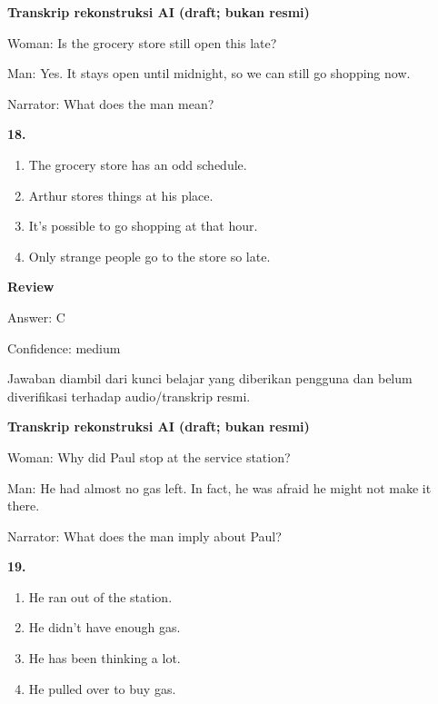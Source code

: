 \documentclass[12pt]{article}
\begin{document}
\endgroup
\par
\vspace{0.25\baselineskip}
\begin{exampleblock}
\textbf{Transkrip rekonstruksi AI (draft; bukan resmi)}\par
Woman: Is the grocery store still open this late?\par
Man: Yes. It stays open until midnight, so we can still go shopping now.\par
Narrator: What does the man mean?\par
\end{exampleblock}
\noindent\textbf{18.}
\begin{enumerate}[label=(\Alph*),leftmargin=*,itemsep=0.2em]
\item The grocery store has an odd schedule.
\item Arthur stores things at his place.
\item It's possible to go shopping at that hour.
\item Only strange people go to the store so late.
\end{enumerate}
\par
\begingroup
\setlength{\parskip}{0pt}
\setlength{\parindent}{0pt}
\textbf{Review}\par
Answer: C\par
Confidence: medium\par
Jawaban diambil dari kunci belajar yang diberikan pengguna dan belum diverifikasi terhadap audio/transkrip resmi.\par
\endgroup
\par
\vspace{0.25\baselineskip}
\begin{exampleblock}
\textbf{Transkrip rekonstruksi AI (draft; bukan resmi)}\par
Woman: Why did Paul stop at the service station?\par
Man: He had almost no gas left. In fact, he was afraid he might not make it there.\par
Narrator: What does the man imply about Paul?\par
\end{exampleblock}
\noindent\textbf{19.}
\begin{enumerate}[label=(\Alph*),leftmargin=*,itemsep=0.2em]
\item He ran out of the station.
\item He didn't have enough gas.
\item He has been thinking a lot.
\item He pulled over to buy gas.
\end{enumerate}
\end{document}
